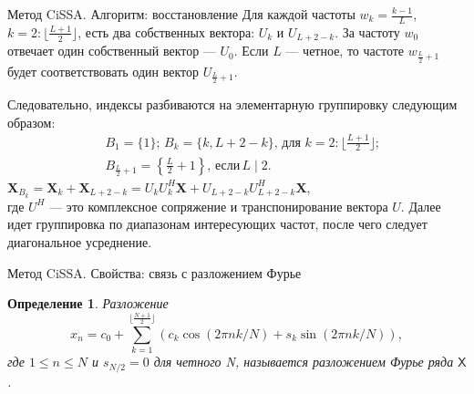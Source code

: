 \documentclass[notheorems, handout]{beamer}
\newtheorem{comment}{Замечание} %
\newtheorem{definition}{Определение}
\newcommand{\TS}{\mathsf{X}}
\begin{document}
	
	
	\begin{frame}{Метод CiSSA. Алгоритм: восстановление}
		Для каждой частоты $w_k = \frac{k-1}{L}$, $k = 2:\lfloor \frac{L+1}{2} \rfloor$, есть два собственных вектора: $U_k$ и $U_{L+2-k}$. За частоту $w_0$ отвечает один собственный вектор --- $U_0$. Если $L$ --- четное, то частоте $w_{\frac{L}{2} + 1}$ будет соответствовать один вектор $U_{\frac{L}{2}+1}$.
		
		Следовательно, индексы разбиваются на элементарную группировку следующим образом:
		\begin{equation*}
			\begin{split}
				&B_1 = \{1\}; \, B_k = \{k, L+2-k\}, \,  \text{для } k = 2:\lfloor \frac{L+1}{2}\rfloor; \\ \, 
				&B_{\frac{L}{2} + 1} = \left\{ \frac{L}{2} + 1 \right\}, \, \text{если} \, L \mid  2.
			\end{split}
		\end{equation*}
		$\mathbf X_{B_k} = \mathbf X_k + \mathbf X_{L+2-k} = U_k U_k^H \mathbf X + U_{L+2-k} U_{L+2-k}^H \mathbf X$, \\где $U^H$ --- это комплексное сопряжение и транспонирование вектора $U$. Далее идет группировка по диапазонам интересующих частот, после чего следует диагональное усреднение.
		
		
	\end{frame}
	
	
	
	\begin{frame}{Метод CiSSA. Свойства: связь с разложением Фурье}
		\begin{definition}
			Разложение
			\begin{equation}
				\label{eq:fourier}
				x_n = c_0 + \sum\limits_{k = 1}^{\lfloor \frac{N+1}{2} \rfloor}\left(c_k \cos(2\pi n k / N) + s_k \sin(2\pi n k / N) \right),
			\end{equation}
			где $1 \leq n \leq N$ и $s_{N/2} = 0 $ для четного N, называется разложением Фурье ряда $\TS$. 
		\end{definition}

		
	\end{frame}
	
\end{document}
